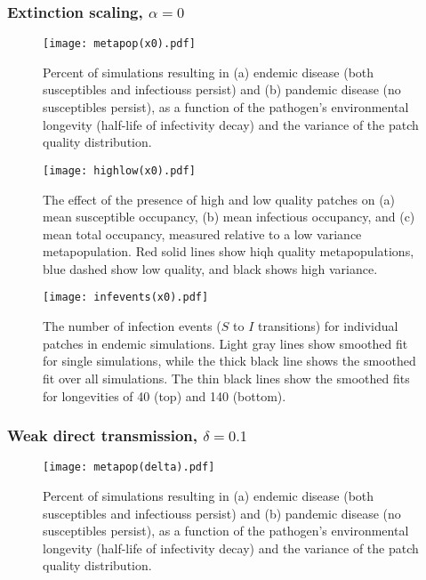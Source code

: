 \documentclass{svjour3}
\begin{document}
\clearpage

\subsubsection{Extinction scaling, $\alpha = 0$}

\begin{figure}[h!]
\centering
\texttt{[image: metapop(x0).pdf]}
\caption{Percent of simulations resulting in (a) endemic disease (both susceptibles and infectiouss persist) and (b) pandemic disease (no susceptibles persist), as a function of the pathogen's environmental longevity (half-life of infectivity decay) and the variance of the patch quality distribution.}
\label{poutcome_x0}
\end{figure}   

\begin{figure}
\centering
\texttt{[image: highlow(x0).pdf]}
\caption{The effect of the presence of high and low quality patches on (a) mean susceptible occupancy, (b) mean infectious occupancy, and (c) mean total occupancy, measured relative to  a low variance metapopulation.  Red solid lines show hiqh quality metapopulations, blue dashed show low quality, and black shows high variance.}
\label{sens_x0}
\end{figure}

\begin{figure}
\centering
\texttt{[image: infevents(x0).pdf]}
\caption{The number of infection events ($S$ to $I$ transitions) for individual patches in endemic simulations.  Light gray lines show smoothed fit for single simulations, while the thick black line shows the smoothed fit over all simulations.  The thin black lines show the smoothed fits for longevities of 40 (top) and 140 (bottom).}
\label{infections_x0}
\end{figure}

\clearpage

\subsubsection{Weak direct transmission, $\delta = 0.1$}

\begin{figure}[h!]
\centering
\texttt{[image: metapop(delta).pdf]}
\caption{Percent of simulations resulting in (a) endemic disease (both susceptibles and infectiouss persist) and (b) pandemic disease (no susceptibles persist), as a function of the pathogen's environmental longevity (half-life of infectivity decay) and the variance of the patch quality distribution.}
\label{poutcome_delta}
\end{figure}   
\end{document}

